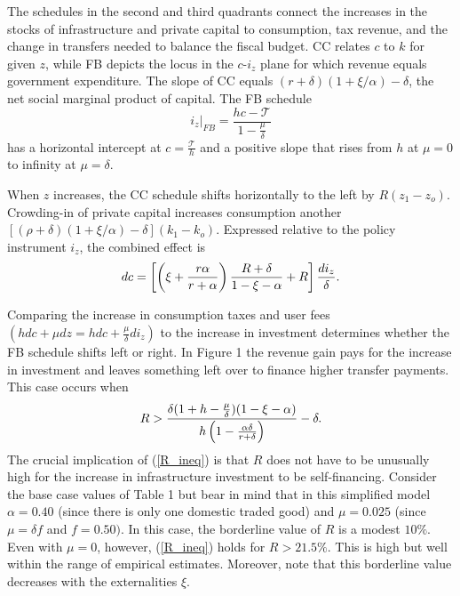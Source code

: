 \documentclass[11pt]{article}
\begin{document}
The schedules in the second and third quadrants connect the increases in the
stocks of infrastructure and private capital to consumption, tax revenue,
and the change in transfers needed to balance the fiscal budget. CC relates $%
c$ to $k$ for given $z$, while FB depicts the locus in the $c$-$i_{z}$ plane
for which revenue equals government expenditure. The slope of CC equals $%
(r+\delta )(1+\xi /\alpha )-\delta $, the net social marginal product of
capital. The FB schedule 
\begin{equation*}
\left. i_{z}\right\vert _{FB}=\frac{hc-\mathcal{T}}{1-\frac{\mu }{\delta }}
\end{equation*}%
has a horizontal intercept at $c=\frac{\mathcal{T}}{h}$ and a positive slope
that rises from $h$ at $\mu =0$ to infinity at $\mu =\delta $.

When $z$ increases, the CC schedule shifts horizontally to the left by $%
R(z_{1}-z_{o})$. Crowding-in of private capital increases consumption
another $[(\rho +\delta )(1+\xi /\alpha )-\delta ](k_{1}-k_{o})$. Expressed
relative to the policy instrument $i_{z}$, the combined effect is 
\begin{equation*}
dc=\left[ \left( \xi +\frac{r\alpha }{r+\alpha }\right) \frac{R+\delta }{%
1-\xi -\alpha }+R\right] \frac{di_{z}}{\delta }.
\end{equation*}

Comparing the increase in consumption taxes and user fees $(hdc+\mu dz=hdc+%
\frac{\mu }{\delta }di_{z})$ to the increase in investment determines
whether the FB schedule shifts left or right. In Figure 1 the revenue gain
pays for the increase in investment and leaves something left over to
finance higher transfer payments. This case occurs when 
\begin{equation}
R>\frac{\delta (1+h-\frac{\mu }{\delta })(1-\xi -\alpha )}{h\left( 1-\frac{%
\alpha \delta }{r+\delta }\right) }-\delta .  \label{R_ineq}
\end{equation}%
The crucial implication of (\ref{R_ineq}) is that $R$ does not have to be
unusually high for the increase in infrastructure investment to be
self-financing. Consider the base case values of Table 1 but bear in mind
that in this simplified model $\alpha =0.40$ (since there is only one
domestic traded good) and $\mu =0.025$ (since $\mu =\delta f$ and $f=0.50).$
In this case, the borderline value of $R$ is a modest $10\%$. Even with $\mu
=0$, however, (\ref{R_ineq}) holds for $R>21.5\%$. This is high but well
within the range of empirical estimates. Moreover, note that this borderline
value decreases with the externalities $\xi $.
\end{document}
